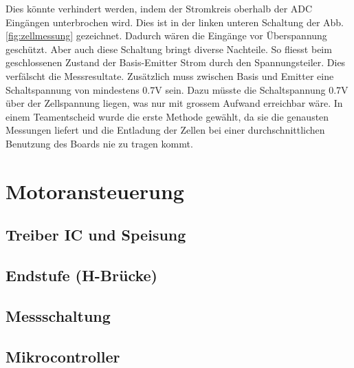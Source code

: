 Dies könnte verhindert werden, indem der Stromkreis oberhalb der ADC Eingängen unterbrochen wird. Dies ist in der linken unteren Schaltung der Abb.\ref{fig:zellmessung} gezeichnet. Dadurch wären die Eingänge vor Überspannung geschützt. Aber auch diese Schaltung bringt diverse Nachteile. So fliesst beim geschlossenen Zustand der Basis-Emitter Strom durch den Spannungsteiler. Dies verfälscht die Messresultate. Zusätzlich muss zwischen Basis und Emitter eine Schaltspannung von mindestens 0.7V sein. Dazu müsste die Schaltspannung 0.7V über der Zellspannung liegen, was nur mit grossem Aufwand erreichbar wäre. 
In einem Teamentscheid wurde die erste Methode gewählt, da sie die genausten Messungen liefert und die Entladung der Zellen bei einer durchschnittlichen Benutzung des Boards nie  zu tragen kommt.

\section{Motoransteuerung}
\label{HW_Motoransteuerung}
\subsection*{Treiber IC und Speisung}
\subsection*{Endstufe (H-Brücke)}
\subsection*{Messschaltung}
\subsection*{Mikrocontroller}

